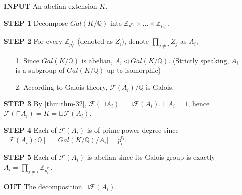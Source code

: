 \begin{importantbox}
\begin{enumerate}
	\item[\textbf{INPUT}] An abelian extension $K$.
	\item[\textbf{STEP 1}] Decompose $Gal(K/\mathbb{Q})$ into $\mathbb{Z}_{p_1^{r_1}} \times \dots \times \mathbb{Z}_{p_n^{r_n}}$.
	\item[\textbf{STEP 2}] For every $\mathbb{Z}_{p_i^{r_i}}$ (denoted as $Z_i$), denote $\prod_{j \neq i} Z_j$ as $A_i$,
        \begin{enumerate}
        \item[1.] Since $Gal(K/\mathbb{Q})$ is abelian, $A_i \lhd Gal(K/\mathbb{Q})$. (Strictly speaking, $A_i$ is a subgroup of $Gal(K/\mathbb{Q})$ up to isomorphic)
        \item[2.] According to Galois theory, $\mathcal{F}(A_i)/\mathbb{Q}$ is Galois.
        \end{enumerate}
    \item[\textbf{STEP 3}] By \autoref{thm:thm-32}, $\mathcal{F}(\sqcap A_i) = \sqcup \mathcal{F}(A_i)$. $\sqcap A_i = {1}$, hence $\mathcal{F}(\sqcap A_i) = K = \sqcup \mathcal{F}(A_i)$.
    \item[\textbf{STEP 4}] Each of $\mathcal{F}(A_i)$ is of prime power degree since $[\mathcal{F}(A_i) : \mathbb{Q}] = |Gal(K/\mathbb{Q})/A_i| = p_i^{r_i}$.
    \item[\textbf{STEP 5}] Each of $\mathcal{F}(A_i)$ is abelian since its Galois group is exactly $A_i = \prod_{j \neq i} \mathbb{Z}_{p_i^{r_i}}$.
    \item[\textbf{OUT}] The decomposition $\sqcup \mathcal{F}(A_i)$.
\end{enumerate}
\end{importantbox}
